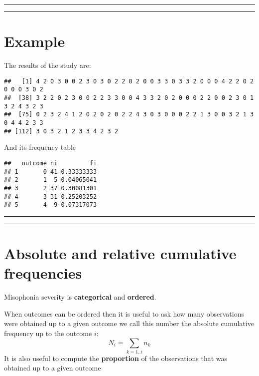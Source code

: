 \documentclass[
]{book}
\begin{document}
\begin{center}\rule{0.5\linewidth}{0.5pt}\end{center}

\begin{center}\rule{0.5\linewidth}{0.5pt}\end{center}

\hypertarget{example-2}{%
\section{Example}\label{example-2}}

The results of the study are:

\begin{verbatim}
##   [1] 4 2 0 3 0 0 2 3 0 3 0 2 2 0 2 0 0 3 3 0 3 3 2 0 0 0 4 2 2 0 2 0 0 0 3 0 2
##  [38] 3 2 2 0 2 3 0 0 2 2 3 3 0 0 4 3 3 2 0 2 0 0 0 2 2 0 0 2 3 0 1 3 2 4 3 2 3
##  [75] 0 2 3 2 4 1 2 0 2 0 2 0 2 2 4 3 0 3 0 0 0 2 2 1 3 0 0 3 2 1 3 0 4 4 2 3 3
## [112] 3 0 3 2 1 2 3 3 4 2 3 2
\end{verbatim}

And its frequency table

\begin{verbatim}
##   outcome ni         fi
## 1       0 41 0.33333333
## 2       1  5 0.04065041
## 3       2 37 0.30081301
## 4       3 31 0.25203252
## 5       4  9 0.07317073
\end{verbatim}

\begin{center}\rule{0.5\linewidth}{0.5pt}\end{center}

\begin{center}\rule{0.5\linewidth}{0.5pt}\end{center}

\hypertarget{absolute-and-relative-cumulative-frequencies}{%
\section{Absolute and relative cumulative frequencies}\label{absolute-and-relative-cumulative-frequencies}}

Misophonia severity is \textbf{categorical} and \textbf{ordered}.

When outcomes can be ordered then it is useful to ask how many observations were obtained up to a given outcome we call this number the absolute cumulative frequency up to the outcome \(i\):
\[N_i=\sum_{k=1..i} n_k\]
It is also useful to compute the \textbf{proportion} of the observations that was obtained up to a given outcome
\end{document}
